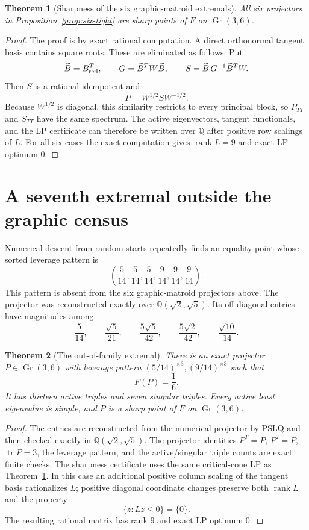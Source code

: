 \documentclass[11pt]{article}
\numberwithin{equation}{section}
\newtheorem{theorem}{Theorem}[section]
\theoremstyle{definition}
\newcommand{\Gr}{\operatorname{Gr}}
\newcommand{\tr}{\operatorname{tr}}
\newcommand{\rank}{\operatorname{rank}}
\begin{document}
\begin{theorem}[Sharpness of the six graphic-matroid extremals]\label{thm:six-sharp}
All six projectors in Proposition~\ref{prop:six-tight} are sharp points of
$F$ on $\Gr(3,6)$.
\end{theorem}

\begin{proof}
The proof is by exact rational computation.  A direct orthonormal tangent basis
contains square roots.  These are eliminated as follows.  Put
\[
  \widetilde B=B_{\rm red}^T,\qquad G=\widetilde B^TW\widetilde B,\qquad
  S=\widetilde B\,G^{-1}\widetilde B^TW.
\]
Then $S$ is a rational idempotent and
\[
  P=W^{1/2}SW^{-1/2}.
\]
Because $W^{1/2}$ is diagonal, this similarity restricts to every principal
block, so $P_{TT}$ and $S_{TT}$ have the same spectrum.  The active
eigenvectors, tangent functionals, and the LP certificate can therefore be
written over $\mathbb Q$ after positive row scalings of $L$.  For all six cases
the exact computation gives $\rank L=9$ and exact LP optimum $0$.
\end{proof}

\section{A seventh extremal outside the graphic census}

Numerical descent from random starts repeatedly finds an equality point whose
sorted leverage pattern is
\[
  \left(\frac5{14},\frac5{14},\frac5{14},
        \frac9{14},\frac9{14},\frac9{14}\right).
\]
This pattern is absent from the six graphic-matroid projectors above.  The
projector was reconstructed exactly over $\mathbb Q(\sqrt2,\sqrt5)$.  Its
off-diagonal entries have magnitudes among
\[
  \frac5{14},\qquad
  \frac{\sqrt5}{21},\qquad
  \frac{5\sqrt5}{42},\qquad
  \frac{5\sqrt2}{42},\qquad
  \frac{\sqrt{10}}{14}.
\]

\begin{theorem}[The out-of-family extremal]\label{thm:seventh}
There is an exact projector $P\in\Gr(3,6)$ with leverage pattern
$(5/14)^{\times3},(9/14)^{\times3}$ such that
\[
  F(P)=\frac16.
\]
It has thirteen active triples and seven singular triples.  Every active least
eigenvalue is simple, and $P$ is a sharp point of $F$ on $\Gr(3,6)$.
\end{theorem}

\begin{proof}
The entries are reconstructed from the numerical projector by PSLQ and then
checked exactly in $\mathbb Q(\sqrt2,\sqrt5)$.  The projector identities
$P^T=P$, $P^2=P$, $\tr P=3$, the leverage pattern, and the active/singular
triple counts are exact finite checks.  The sharpness certificate uses the same
critical-cone LP as Theorem~\ref{thm:six-sharp}.  In this case an additional
positive column scaling of the tangent basis rationalizes $L$; positive diagonal
coordinate changes preserve both $\rank L$ and the property
\[
  \{z:Lz\le0\}=\{0\}.
\]
The resulting rational matrix has rank $9$ and exact LP optimum $0$.
\end{proof}
\end{document}
